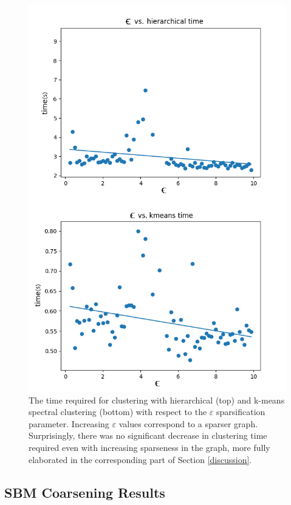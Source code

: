 \documentclass{article}
\begin{document}
\begin{figure}[H]
    \label{fig:results_time_sparse}
    \centering
    \includegraphics[width=.85\textwidth]{results/results_time_sparse.png}
    \caption[Clustering time vs. $\varepsilon$ sparsification parameter]{The time required for clustering with hierarchical (top) and k-means spectral clustering (bottom) with respect to the $\varepsilon$ sparsification parameter. Increasing $\varepsilon$ values correspond to a sparser graph. Surprisingly, there was no significant decrease in clustering time required even with increasing sparseness in the graph, more fully elaborated in the corresponding part of Section \ref{discussion}.}
\end{figure}

\subsection{SBM Coarsening Results}
\end{document}

